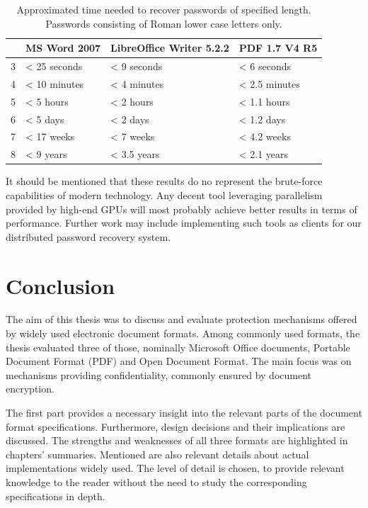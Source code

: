 \documentclass[11pt,oneside]{fithesis2}
\begin{document}
 \begin{table}[h]
	\centering
	\begin{tabular}{|l|l|l|l|}
           \hline
		&\textbf{MS Word 2007}&\textbf{LibreOffice Writer 5.2.2}&\textbf{PDF 1.7 V4 R5}\\
	\hline
		3&< 25 seconds&< 9 seconds&< 6 seconds\\
	\hline
		4&< 10 minutes&< 4 minutes&< 2.5 minutes\\
	\hline
		5&< 5 hours& < 2 hours&< 1.1 hours\\
	\hline
		6&< 5 days&< 2 days&< 1.2 days\\
	\hline
		7&< 17 weeks&< 7 weeks&< 4.2 weeks\\
	\hline
		8&< 9 years&< 3.5 years&< 2.1 years\\
	\hline
           \end{tabular}
	\caption{Approximated time needed to recover passwords of specified length. Passwords consisting of Roman lower case letters only.}
	\label{real_world_time}
\end{table}

It should be mentioned that these results do no represent the brute-force capabilities of modern technology. Any decent tool leveraging parallelism provided by high-end GPUs will most probably achieve better results in terms of performance. Further work may include implementing such tools as clients for our distributed password recovery system. 

\chapter{Conclusion}

The aim of this thesis was to discuss and evaluate protection mechanisms offered by widely used electronic document formats. Among commonly used formats, the thesis evaluated three of those, nominally Microsoft Office documents, Portable Document Format (PDF) and Open Document Format. The main focus was on mechanisms providing confidentiality, commonly ensured by document encryption. 

The first part provides a necessary insight into the relevant parts of the document format specifications. Furthermore, design decisions and their implications are discussed. The strengths and weaknesses of all three formats are highlighted in chapters' summaries. Mentioned are also relevant details about actual implementations widely used. The level of detail is chosen, to provide relevant knowledge to the reader without the need to study the corresponding specifications in depth.
\end{document}
